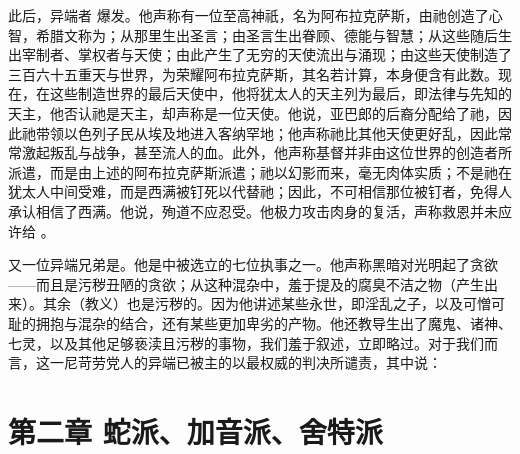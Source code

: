 此后，异端者 爆发。他声称有一位至高神祇，名为阿布拉克萨斯，由祂创造了心智，希腊文称为；从那里生出圣言；由圣言生出眷顾、德能与智慧；从这些随后生出宰制者、掌权者与天使；由此产生了无穷的天使流出与涌现；由这些天使制造了三百六十五重天与世界，为荣耀阿布拉克萨斯，其名若计算，本身便含有此数。现在，在这些制造世界的最后天使中，他将犹太人的天主列为最后，即法律与先知的天主，他否认祂是天主，却声称是一位天使。他说，亚巴郎的后裔分配给了祂，因此祂带领以色列子民从埃及地进入客纳罕地；他声称祂比其他天使更好乱，因此常常激起叛乱与战争，甚至流人的血。此外，他声称基督并非由这位世界的创造者所派遣，而是由上述的阿布拉克萨斯派遣；祂以幻影而来，毫无肉体实质；不是祂在犹太人中间受难，而是西满被钉死以代替祂；因此，不可相信那位被钉者，免得人承认相信了西满。他说，殉道不应忍受。他极力攻击肉身的复活，声称救恩并未应许给 。\par

又一位异端兄弟是。他是中被选立的七位执事之一。他声称黑暗对光明起了贪欲——而且是污秽丑陋的贪欲；从这种混杂中，羞于提及的腐臭不洁之物（产生出来）。其余（教义）也是污秽的。因为他讲述某些永世，即淫乱之子，以及可憎可耻的拥抱与混杂的结合，还有某些更加卑劣的产物。他还教导生出了魔鬼、诸神、七灵，以及其他足够亵渎且污秽的事物，我们羞于叙述，立即略过。对于我们而言，这一尼苛劳党人的异端已被主的以最权威的判决所谴责，其中说：\par


\section{第二章 蛇派、加音派、舍特派}

